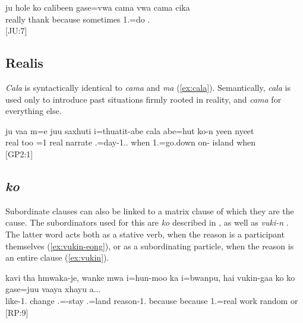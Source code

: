 \ea\label{ex:cama2}\gll ju hole ko calibeen gase=vwa cama vwa cama cika\\
 really thank because sometimes 1.=do    .\\
\glt {} {[JU:7]}
\z

\subsection{Realis }
\label{ssec:while}

\textit{Cala} is syntactically identical to \textit{cama} and \textit{ma} (\ref{ex:cala}). Semantically, \textit{cala} is used only to introduce past situations firmly rooted in reality, and \textit{cama} for everything else.

\ea \label{ex:cala}\gll  ju vaa m=e juu saxhuti i=thuatit-abe cala abe=hut ko-n yeen nyeet\\
 real too =1 real narrate .=day-1.. when 1.=go.down on- island when\\
\glt {} {[GP2:1]}
\z

\subsection{\textit{ko} }
\label{sec:ko_cause}
Subordinate clauses can also be linked to a matrix clause of which they are the cause. The subordinators used for this are \textit{ko}  described in , as well as \textit{vuki-n} . The latter word acts both as a stative verb, when the reason is a participant themselves (\ref{ex:vukin-eong}), or as a subordinating particle, when the reason is an entire clause (\ref{ex:vukin}).

\ea\label{ex:vukin-eong}\gll  ‎‎kavi tha hmwaka-je, wanke mwa i=hun-moo ka i=bwanpu, hai vukin-gaa ko ko gase=juu vaaya xhayu a...\\
   like-1. change  .=-stay  .=land  reason-1. because because 1.=real work random or \\
\glt {} {[RP:9]}
\z


